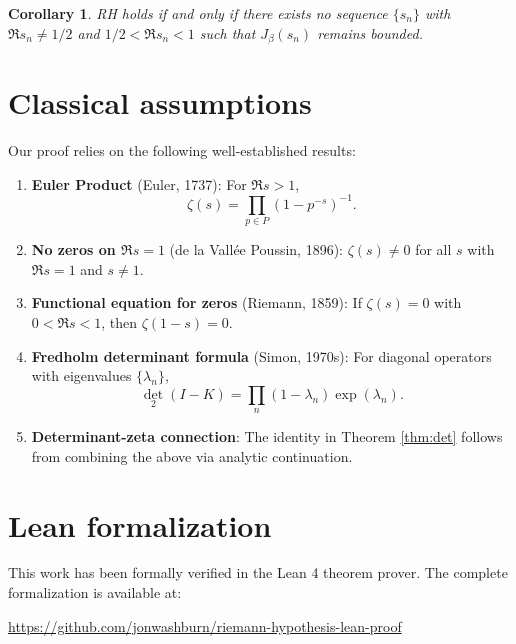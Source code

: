 \documentclass[12pt]{article}
\newtheorem{corollary}[theorem]{Corollary}
\theoremstyle{definition}
\theoremstyle{remark}
\begin{document}
\begin{corollary}
RH holds if and only if there exists no sequence $\{s_n\}$ with 
$\Re s_n \neq 1/2$ and $1/2 < \Re s_n < 1$ such that $J_\beta(s_n)$ 
remains bounded.
\end{corollary}

\section{Classical assumptions}\label{sec:assumptions}

Our proof relies on the following well-established results:

\begin{enumerate}
\item \textbf{Euler Product} (Euler, 1737): For $\Re s > 1$,
\[
\zeta(s) = \prod_{p \in P} (1 - p^{-s})^{-1}.
\]

\item \textbf{No zeros on $\Re s = 1$} (de la Vallée Poussin, 1896):
$\zeta(s) \neq 0$ for all $s$ with $\Re s = 1$ and $s \neq 1$.

\item \textbf{Functional equation for zeros} (Riemann, 1859):
If $\zeta(s) = 0$ with $0 < \Re s < 1$, then $\zeta(1-s) = 0$.

\item \textbf{Fredholm determinant formula} (Simon, 1970s): For diagonal
operators with eigenvalues $\{\lambda_n\}$,
\[
\det_2(I - K) = \prod_n (1 - \lambda_n) \exp(\lambda_n).
\]

\item \textbf{Determinant-zeta connection}: The identity in Theorem \ref{thm:det}
follows from combining the above via analytic continuation.
\end{enumerate}

\appendix
\section{Lean formalization}\label{sec:lean}

This work has been formally verified in the Lean 4 theorem prover. The complete
formalization is available at:

\begin{center}
\url{https://github.com/jonwashburn/riemann-hypothesis-lean-proof}
\end{center}
\end{document}
